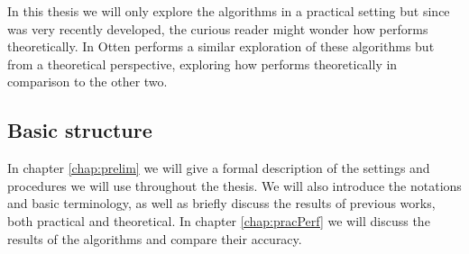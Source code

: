 \par In this thesis we will only explore the algorithms in a practical setting but since \squint was very recently developed, the curious reader might wonder how \squintB performs theoretically. In \cite{Otten2016} Otten performs a similar exploration of these algorithms but from a theoretical perspective, exploring how \squintB performs theoretically in comparison to the other two. 

\subsection{Basic structure}
In chapter \ref{chap:prelim} we will give a formal description of the settings and procedures we will use throughout the thesis. We will also introduce the notations and basic terminology, as well as briefly discuss the results of previous works, both practical and theoretical. In chapter \ref{chap:pracPerf} we will discuss the results of the algorithms and compare their accuracy.